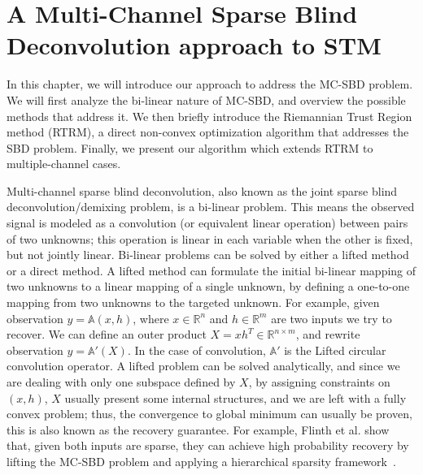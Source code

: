 \section{A Multi-Channel Sparse Blind Deconvolution approach to STM}

In this chapter, we will introduce our approach to address the \ac{MC-SBD} problem. We will first analyze the bi-linear nature of \ac{MC-SBD}, and overview the possible methods that address it. We then briefly introduce the Riemannian Trust Region method (RTRM), a direct non-convex optimization algorithm that addresses the \ac{SBD} problem. Finally, we present our algorithm which extends \ac{RTRM} to multiple-channel cases. 

Multi-channel sparse blind deconvolution, also known as the joint sparse blind deconvolution/demixing problem, is a bi-linear problem. This means the observed signal is modeled as a convolution (or equivalent linear operation) between pairs of two unknowns; this operation is linear in each variable when the other is fixed, but not jointly linear. Bi-linear problems can be solved by either a lifted method or a direct method. A lifted method can formulate the initial bi-linear mapping of two unknowns to a linear mapping of a single unknown, by defining a one-to-one mapping from two unknowns to the targeted unknown. For example, given observation $y = \mathbb{A}(x,h)$, where $x \in \mathbb{R}^n$ and $h \in \mathbb{R}^m$ are two inputs we try to recover. We can define an outer product $X = xh^T\in \mathbb{R}^{n\times m}$, and rewrite observation $y = \mathbb{A'}(X)$. In the case of convolution, $\mathbb{A'}$ is the Lifted circular convolution operator. A lifted problem can be solved analytically, and since we are dealing with only one subspace defined by $X$, by assigning constraints on $(x,h)$,  $X$ usually present some internal structures, and we are left with a fully convex problem; thus, the convergence to global minimum can usually be proven, this is also known as the recovery guarantee. For example, Flinth et al. show that, given both inputs are sparse, they can achieve high probability recovery by lifting the \ac{MC-SBD} problem and applying a hierarchical sparsity framework~\cite{flinthBisparseBlindDeconvolution2024}. 

